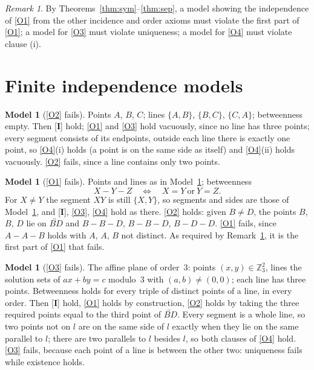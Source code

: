 \documentclass[11pt]{amsart}
\newcommand{\set}[1]{\{#1\}}
\newcommand{\Z}{\mathbb{Z}}
\theoremstyle{definition}
\newtheorem{model}[thm]{Model}
\theoremstyle{remark}
\newtheorem{rem}[thm]{Remark}
\begin{document}
\begin{rem}\label{rem:constraints}
By Theorems~\ref{thm:sym}--\ref{thm:sep}, a model showing the independence of \ref{O1} from the other incidence and order axioms must violate the first part of \ref{O1}; a model for \ref{O3} must violate uniqueness; a model for \ref{O4} must violate clause (i).
\end{rem}

\section{Finite independence models}\label{sec:models}

\begin{model}[\ref{O2} fails]\label{mod:O2}
Points $A$, $B$, $C$; lines $\set{A,B}$, $\set{B,C}$, $\set{C,A}$; betweenness empty. Then [\textbf{I}] hold; \ref{O1} and \ref{O3} hold vacuously, since no line has three points; every segment consists of its endpoints, outside each line there is exactly one point, so \ref{O4}(i) holds (a point is on the same side as itself) and \ref{O4}(ii) holds vacuously. \ref{O2} fails, since a line contains only two points.
\end{model}

\begin{model}[\ref{O1} fails]\label{mod:O1}
Points and lines as in Model~\ref{mod:O2}; betweenness
\begin{equation*}
X-Y-Z\quad\Longleftrightarrow\quad X=Y\ \text{or}\ Y=Z.
\end{equation*}
For $X\neq Y$ the segment $XY$ is still $\set{X,Y}$, so segments and sides are those of Model~\ref{mod:O2}, and [\textbf{I}], \ref{O3}, \ref{O4} hold as there. \ref{O2} holds: given $B\neq D$, the points $B$, $B$, $D$ lie on $\overleftrightarrow{BD}$ and $B-B-D$, $B-B-D$, $B-D-D$. \ref{O1} fails, since $A-A-B$ holds with $A$, $A$, $B$ not distinct. As required by Remark~\ref{rem:constraints}, it is the first part of \ref{O1} that fails.
\end{model}

\begin{model}[\ref{O3} fails]\label{mod:O3}
The affine plane of order~$3$: points $(x,y)\in\Z_{3}^{2}$, lines the solution sets of $ax+by=c$ modulo~$3$ with $(a,b)\neq(0,0)$; each line has three points. Betweenness holds for every triple of distinct points of a line, in every order. Then [\textbf{I}] hold, \ref{O1} holds by construction, \ref{O2} holds by taking the three required points equal to the third point of $\overleftrightarrow{BD}$. Every segment is a whole line, so two points not on $l$ are on the same side of $l$ exactly when they lie on the same parallel to $l$; there are two parallels to $l$ besides $l$, so both clauses of \ref{O4} hold. \ref{O3} fails, because each point of a line is between the other two: uniqueness fails while existence holds.
\end{model}
\end{document}
